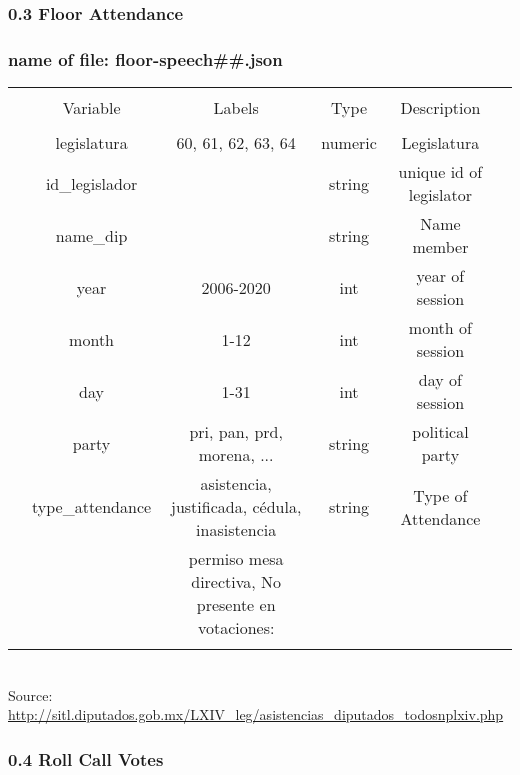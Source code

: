 \documentclass{article}
\begin{document}
\newpage
\subsubsection*{0.3 Floor Attendance}

\subsubsection*{name of file: floor-speech\#\#.json}
\begin{table}[!htbp] \centering 
	\begin{tabular}{@{\extracolsep{5pt}} cccccc} 
		\\[-1.8ex]\hline 
		\hline \\[-1.8ex] 
		& Variable & Labels  & Type & Description \\ 
		\hline \\[-1.8ex] 
		& legislatura  &60, 61, 62, 63, 64 & numeric  & Legislatura   \\ 
		& id\_legislador  &   & string  & unique id of legislator   \\ 
		& name\_dip &   &string & Name member\\
		& year & 2006-2020  &  int & year of session  \\ 
		& month  & 1-12  & int  & month of session  \\ 
		& day & 1-31  & int & day of session\\
		& party & pri, pan, prd, morena, ...   & string& political party\\
		& type\_attendance & asistencia, justificada, cédula, inasistencia & string& Type of Attendance \\
		&& permiso mesa directiva, No presente en votaciones:&&\\
		\hline
		\\[-1.8ex] 
	\end{tabular} 
	\\
	Source:  \url{http://sitl.diputados.gob.mx/LXIV_leg/asistencias_diputados_todosnplxiv.php}\\
\end{table} 

\subsubsection*{0.4 Roll Call Votes}
\end{document}
